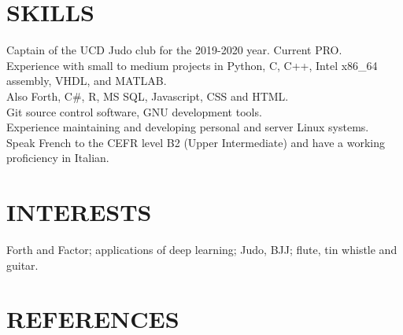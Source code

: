 \documentclass[sectionsleft,centered,10pt]{res}
\begin{document}
\begin{resume}
\section{SKILLS}
Captain of the UCD Judo club for the 2019-2020 year. Current PRO.\\
Experience with small to medium projects in Python, C, C++, Intel x86\_64 assembly, VHDL, and MATLAB.\\
Also Forth, C\#, R, MS SQL, Javascript, CSS and HTML.\\
Git source control software, GNU development tools.\\
Experience maintaining and developing personal and server Linux systems.\\
Speak French to the CEFR level B2 (Upper Intermediate) and have a working proficiency in Italian.
\section{INTERESTS}
Forth and Factor; applications of deep learning; Judo, BJJ; flute, tin whistle and guitar.

\section{REFERENCES}
\fi
\end{resume}
\end{document}
